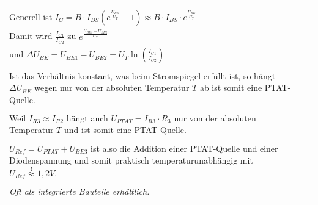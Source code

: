 \begin{longtable}{|l|l|l|}
\begin{minipage}{8cm}
			\textbf{Herleitung:} \\
			Generell ist $I_C = B \cdot I_{BS} \left(e^{\frac{U_{BE}}{U_T}} -1 \right)
							\approx B \cdot I_{BS} \cdot e^{\frac{U_{BE}}{U_T}}$ \\
			Damit wird $\frac{I_{C1}}{I_{C2}}$ zu $e^{\frac{U_{BE1}-U_{BE2}}{U_T}}$ \\
			und $\Delta U_{BE} = U_{BE1}-U_{BE2} = U_T \ln\left(\frac{I_{C1}}{I_{C2}}\right)$ \\
			\\
			Ist das Verhältnis \smash{$\frac{I_{C1}}{I_{C2}}$} konstant, was beim Stromspiegel
			erfüllt ist, so hängt $\Delta U_{BE}$ wegen \smash{$U_T=\frac{k \cdot T}{q}$} nur 
			von der absoluten Temperatur $T$ ab ist somit eine PTAT-Quelle. \\
			\\
			Weil $I_{R3} \approx I_{R2}$ hängt auch $U_{PTAT}=I_{R3} \cdot R_3$ nur von der
			absoluten Temperatur $T$ und ist somit eine PTAT-Quelle. \\
			\\
			$U_{Ref} = U_{PTAT} + U_{BE3}$ ist also die Addition einer PTAT-Quelle und einer
			Diodenspannung und somit praktisch temperaturunabhängig mit 
			$U_{Ref} \stackrel{!}{\approx} 1,2V$. \\
			\\
			\textit{Oft als integrierte Bauteile erhältlich.}
		\end{minipage}
	\\ \hline
\end{longtable}

